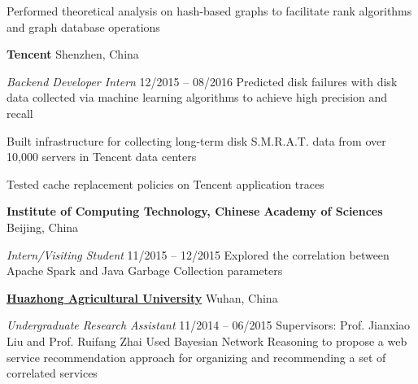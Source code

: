 \documentclass[letterpaper,10pt,oneside]{article}
\begin{document}
\begin{body}
\GapNoBreak
\BulletItem
Performed theoretical analysis on hash-based graphs to facilitate rank algorithms and graph database operations


\BigGap
{\textbf{Tencent}} %
\hfill
Shenzhen, China

\emph{Backend Developer Intern}
\hfill
12/2015 --
08/2016
\GapNoBreak
\BulletItem
Predicted disk failures with disk data collected via machine learning algorithms to achieve high precision and recall

\GapNoBreak
\BulletItem
Built infrastructure for collecting long-term disk S.M.R.A.T. data from over 10,000 servers in Tencent data centers

\GapNoBreak
\BulletItem
Tested cache replacement policies on Tencent application traces

\BigGap
{\textbf{Institute of Computing Technology, Chinese Academy of Sciences}}
\hfill
Beijing, China

\emph{Intern/Visiting Student}
\hfill
11/2015 --
12/2015
\GapNoBreak
\BulletItem
Explored the correlation between Apache Spark and Java Garbage Collection parameters



\BigGap
\href{http://www.hzau.edu.cn/en/HOME.htm}
{\textbf{Huazhong Agricultural University}}
\hfill
Wuhan, China

\emph{Undergraduate Research Assistant}
\hfill
11/2014 --
06/2015
\GapNoBreak
Supervisors: Prof. Jianxiao Liu and Prof. Ruifang Zhai
\GapNoBreak
\BulletItem
Used Bayesian Network Reasoning to propose a web service recommendation approach for organizing and recommending a set of correlated services


\end{body}
\end{document}
